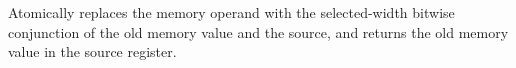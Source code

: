 Atomically replaces the memory operand with the selected-width bitwise conjunction of the old memory value and the source, and returns the old memory value in the source register.
